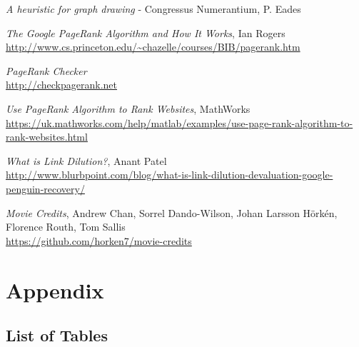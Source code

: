 \documentclass[12pt]{ieeeconf}      %
\begin{document}
\begin{thebibliography}{99}
\emph{A heuristic for graph drawing} -  Congressus Numerantium, P. Eades
\newline
[Published 1984]

\emph{The Google PageRank Algorithm and How It Works}, Ian Rogers\\
\url{http://www.cs.princeton.edu/~chazelle/courses/BIB/pagerank.htm}
\newline
[Accessed 08/03/2017]

\emph{PageRank Checker}\\
\url{http://checkpagerank.net}
\newline
[Accessed 08/03/2017]

\emph{Use PageRank Algorithm to Rank Websites}, MathWorks\\
\url{https://uk.mathworks.com/help/matlab/examples/use-page-rank-algorithm-to-rank-websites.html}
\newline
[Accessed 01/03/2017]

\emph{What is Link Dilution?}, Anant Patel\\
\url{http://www.blurbpoint.com/blog/what-is-link-dilution-devaluation-google-penguin-recovery/}
\newline
[Accessed 08/03/2017]

\emph{Movie Credits}, Andrew Chan, Sorrel Dando-Wilson, Johan Larsson H\"ork\'en, Florence Routh, Tom Sallis \\
\url{https://github.com/horken7/movie-credits}
\newline
[Accessed 10/03/2017]

\end{thebibliography}
\newpage
\newpage

\onecolumn
\section{Appendix}
\label{appendix}


\subsection{List of Tables}
\end{document}
